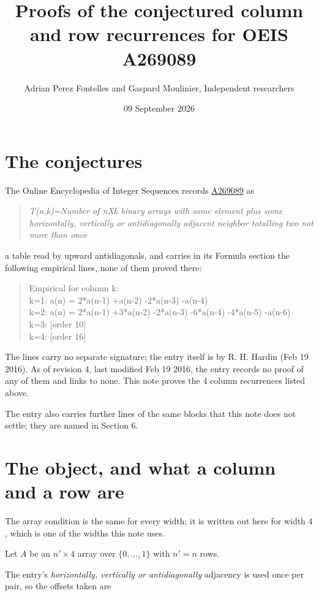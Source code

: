 \documentclass[11pt]{article}
\title{Proofs of the conjectured column and row recurrences for OEIS A269089}
\author{Adrian Perez Fontelles and Gaspard Moulinier, Independent researchers}
\date{09 September 2026}
\theoremstyle{definition}
\begin{document}
\maketitle
\section{The conjectures}

The Online Encyclopedia of Integer Sequences records \href{https://oeis.org/A269089}{A269089} as

\begin{quote}\itshape T(n,k)=Number of nXk binary arrays with some element plus some horizontally, vertically or antidiagonally adjacent neighbor totalling two not more than once\end{quote}

a table read by upward antidiagonals, and carries in its Formula section the following empirical lines, none of them proved there:

\begin{quote}\ttfamily Empirical for column k:\\
k=1: a(n) = 2*a(n-1) +a(n-2) -2*a(n-3) -a(n-4)\\k=2: a(n) = 2*a(n-1) +3*a(n-2) -2*a(n-3) -6*a(n-4) -4*a(n-5) -a(n-6)\\k=3: [order 10]\\k=4: [order 16]\end{quote}

The lines carry no separate signature; the entry itself is by R. H. Hardin (Feb 19 2016). As of revision 4, last modified Feb 19 2016, the entry records no proof of any of them and links to none. This note proves the 4 column recurrences listed above.

The entry also carries further lines of the same blocks that this note does not settle; they are named in Section 6.

\section{The object, and what a column and a row are}

The array condition is the same for every width; it is written out here for width $4$, which is one of the widths this note uses.

Let $A$ be an $n' \times 4$ array over $\{0,\dots,1\}$ with $n' = n$ rows.

The entry's {\itshape horizontally, vertically or antidiagonally} adjacency is used once per pair, so the offsets taken are
\end{document}
